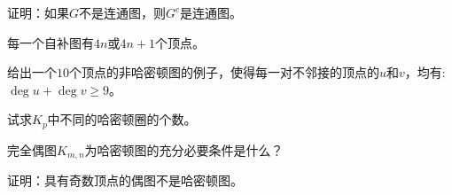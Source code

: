 \documentclass{article}
\begin{document}
\begin{CJK}{UTF8}{gbsn}
\begin{Exercise}
  证明：如果$G$不是连通图，则$G^c$是连通图。
\end{Exercise}

\begin{Exercise}
  每一个自补图有$4n$或$4n+1$个顶点。
\end{Exercise}
\begin{Exercise}
  给出一个$10$个顶点的非哈密顿图的例子，使得每一对不邻接的顶点的$u$和$v$，均有:$\deg u + \deg v \geq 9$。
\end{Exercise}
\begin{Exercise}
  试求$K_p$中不同的哈密顿圈的个数。
\end{Exercise}

\begin{Exercise}
  完全偶图$K_{m,n}$为哈密顿图的充分必要条件是什么？
\end{Exercise}

\begin{Exercise}
  证明：具有奇数顶点的偶图不是哈密顿图。
\end{Exercise}


\end{CJK}
\end{document}
